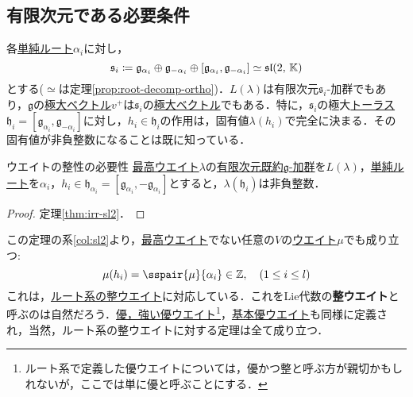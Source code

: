 \documentclass[rep_main]{subfiles}
\begin{document}
\subsection{有限次元である必要条件}
各\hyperref[def:base-root]{単純ルート}$\alpha_i$に対し，
	\begin{equation}
		\mathfrak{s}_i \coloneqq \mathfrak{g}_{\alpha_i} \oplus \mathfrak{g}_{-\alpha_i} \oplus [\mathfrak{g}_{\alpha_i}, \mathfrak{g}_{-\alpha_i}] \simeq \mathfrak{sl}(2,\, \mathbb{K})
	\end{equation}
	とする($\simeq$は定理\ref{prop:root-decomp-ortho})．$L(\lambda)$は有限次元$\mathfrak{s}_i$-加群でもあり，$\mathfrak{g}$の\hyperref[def:maximal-vector-rep]{極大ベクトル}$v^+$は$\mathfrak{s}_i$の\hyperref[def:maximal-vector-rep]{極大ベクトル}でもある．特に，$\mathfrak{s}_i$の極大\hyperref[def:toral-subLieAlg]{トーラス}$\mathfrak{h}_i = [\mathfrak{g}_{\alpha_i}, \mathfrak{g}_{-\alpha_i}]$に対し，$h_i \in \mathfrak{h}_i$の作用は，固有値$\lambda(h_i)$で完全に決まる．その固有値が非負整数になることは既に知っている．
\begin{mytheo}[label=thm:necessary-for-finite]{ウエイトの整性の必要性}
	\hyperref[def:highest-weight-module]{最高ウエイト}$\lambda$の\hyperref[thm:hwmodule-exist]{有限次元既約$\mathfrak{g}$-加群}を$L(\lambda)$，\hyperref[def:base-root]{単純ルート}を$\alpha_i$，$h_i \in \mathfrak{h}_{\alpha_i} = [\mathfrak{g}_{\alpha_i}, -\mathfrak{g}_{\alpha_i}]$とすると，$\lambda(\mathfrak{h}_i)$は非負整数．
\end{mytheo}
\begin{proof}
	定理\ref{thm:irr-sl2}．
\end{proof}
この定理の系\ref{col:sl2}より，\hyperref[def:highest-weight-module]{最高ウエイト}でない任意の$V$の\hyperref[def:weight-rep]{ウエイト}$\mu$でも成り立つ:
\begin{equation}
	\label{eq:int-weight}
	\mu(h_i) = \sspair{\mu}{\alpha_i} \in \mathbb{Z},\quad  (1 \leq i \leq l)
\end{equation}
これは，\hyperref[def:root-lattice]{ルート系の整ウエイト}に対応している．これをLie代数の\textbf{整ウエイト}と呼ぶのは自然だろう．\hyperref[def:domweight]{優，強い優ウエイト}\footnote{ルート系で定義した優ウエイトについては，優かつ整と呼ぶ方が親切かもしれないが，ここでは単に優と呼ぶことにする．}，\hyperref[def:fundamental-weight]{基本優ウエイト}も同様に定義され，当然，ルート系の整ウエイトに対する定理は全て成り立つ．\\
\end{document}
